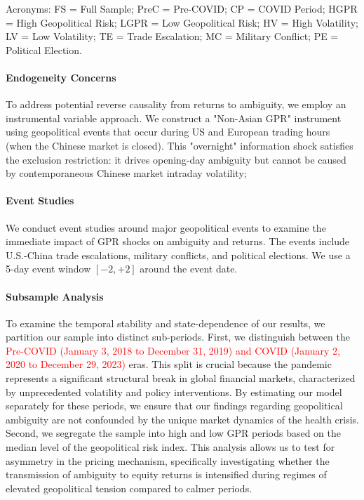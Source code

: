 \documentclass[preprint,12pt,authoryear]{elsarticle}
\begin{document}
\begin{table}[htbp]
\begin{threeparttable}
\begin{tablenotes}[flushleft]
\item[] Acronyms: FS = Full Sample; PreC = Pre-COVID; CP = COVID Period; HGPR = High Geopolitical Risk; LGPR = Low Geopolitical Risk; HV = High Volatility; LV = Low Volatility; TE = Trade Escalation; MC = Military Conflict; PE = Political Election.
\end{tablenotes}
\end{threeparttable}
\end{table}

\paragraph{Endogeneity Concerns} To address potential reverse causality from returns to ambiguity, we employ an instrumental variable approach. We construct a "Non-Asian GPR" instrument using geopolitical events that occur during US and European trading hours (when the Chinese market is closed). This "overnight" information shock satisfies the exclusion restriction: it drives opening-day ambiguity but cannot be caused by contemporaneous Chinese market intraday volatility;

\paragraph{Event Studies} We conduct event studies around major geopolitical events to examine the immediate impact of GPR shocks on ambiguity and returns. The events include U.S.-China trade escalations, military conflicts, and political elections. We use a 5-day event window $[-2, +2]$ around the event date.

\paragraph{Subsample Analysis} To examine the temporal stability and state-dependence of our results, we partition our sample into distinct sub-periods. First, we distinguish between the \textcolor{red}{Pre-COVID (January 3, 2018 to December 31, 2019) and COVID (January 2, 2020 to December 29, 2023)} eras. This split is crucial because the pandemic represents a significant structural break in global financial markets, characterized by unprecedented volatility and policy interventions. By estimating our model separately for these periods, we ensure that our findings regarding geopolitical ambiguity are not confounded by the unique market dynamics of the health crisis. Second, we segregate the sample into high and low GPR periods based on the median level of the geopolitical risk index. This analysis allows us to test for asymmetry in the pricing mechanism, specifically investigating whether the transmission of ambiguity to equity returns is intensified during regimes of elevated geopolitical tension compared to calmer periods.
\end{document}
